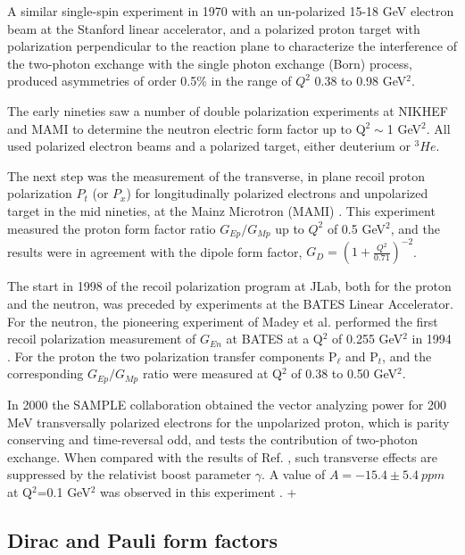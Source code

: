 A similar single-spin experiment in 1970 with an un-polarized 15-18 GeV electron beam at the Stanford linear accelerator,
 and a polarized proton target with polarization perpendicular to the reaction plane to characterize the interference of
 the two-photon exchange with the single photon exchange (Born) process, produced asymmetries of order 0.5\% in the
 range of $Q^2$ 0.38 to 0.98 GeV$^2$. 

The early nineties saw a number of double polarization experiments at NIKHEF \cite{passchier} and MAMI \cite{herberg,ostrick} to determine 
the neutron electric form factor up to 
Q$^2\sim $1 GeV$^2$. All used polarized electron beams and a polarized target, either deuterium or $^3He$.  

The next step was the measurement of the transverse, in plane recoil proton polarization $P_t$ (or $P_x$) for longitudinally 
polarized electrons and unpolarized target in the mid nineties, at the Mainz Microtron (MAMI) \cite{eyl:1995,pospischil}. 
This experiment measured the proton form factor ratio $G_{Ep}/G_{Mp}$ up to $Q^2$ of 0.5 GeV$^2$, and the results were in agreement 
with the dipole form factor, $G_D=(1+\frac{Q^2}{0.71})^{-2}$. 

The start in 1998 of the recoil polarization program at JLab, both for the proton and the neutron, was preceded by experiments at the BATES
 Linear Accelerator. For the neutron, the pioneering experiment of Madey et al. performed the first
 recoil polarization measurement of $G_{En}$ at BATES at a Q$^2$ of 0.255 GeV$^2$ in 1994 \cite{eden:1994}. 
 For the proton the two polarization transfer components P$_{\ell}$ and P$_t$, and the corresponding
 $G_{Ep}/G_{Mp}$ ratio were measured at Q$^2$ of 0.38 to 0.50 GeV$^2$\cite{barkhuff,milbrath}. 

In 2000 the SAMPLE collaboration obtained the vector analyzing power for 200 MeV transversally polarized electrons for the unpolarized proton, 
which is parity conserving and 
time-reversal odd, and tests the contribution of two-photon exchange. When compared with the results of Ref. \cite{bizot}, such transverse effects 
are suppressed by the relativist boost parameter $\gamma$. A value of  $A=-15.4\pm 5.4 \ {ppm}$ at Q$^2$=0.1 GeV$^2$ was observed
in this experiment \cite{beise:2004}. 
+
\subsection{Dirac and Pauli form factors}

